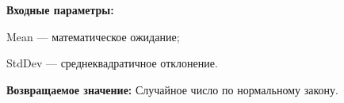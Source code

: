\textbf{Входные параметры:}

Mean --- математическое ожидание;

 StdDev --- среднеквадратичное отклонение.

\textbf{Возвращаемое значение:}
Случайное число по нормальному закону.